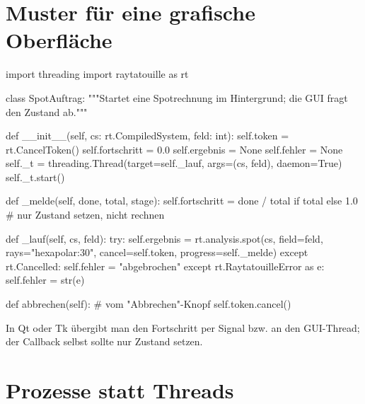 \documentclass[11pt,a4paper,openany]{book}
\DeclareRobustCommand{\code}[1]{\texttt{\directlua{rttcode("\luaescapestring{\detokenize{#1}}")}}}
\begin{document}
\section{Muster für eine grafische Oberfläche}

\begin{pycode}
import threading
import raytatouille as rt

class SpotAuftrag:
    """Startet eine Spotrechnung im Hintergrund; die GUI fragt den Zustand ab."""

    def __init__(self, cs: rt.CompiledSystem, feld: int):
        self.token = rt.CancelToken()
        self.fortschritt = 0.0
        self.ergebnis = None
        self.fehler = None
        self._t = threading.Thread(target=self._lauf, args=(cs, feld), daemon=True)
        self._t.start()

    def _melde(self, done, total, stage):
        self.fortschritt = done / total if total else 1.0   # nur Zustand setzen, nicht rechnen

    def _lauf(self, cs, feld):
        try:
            self.ergebnis = rt.analysis.spot(cs, field=feld, rays="hexapolar:30",
                                             cancel=self.token, progress=self._melde)
        except rt.Cancelled:
            self.fehler = "abgebrochen"
        except rt.RaytatouilleError as e:
            self.fehler = str(e)

    def abbrechen(self):            # vom "Abbrechen"-Knopf
        self.token.cancel()
\end{pycode}
In Qt oder Tk übergibt man den Fortschritt per Signal bzw. \code{after()} an den
GUI-Thread; der Callback selbst sollte nur Zustand setzen.

\section{Prozesse statt Threads}
\label{sec:prozesse}
\end{document}
